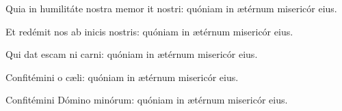 \item Quia in humilitáte nostra memor it nostri:\psstar{} quóniam in ætérnum misericór eius.

\item Et redémit nos ab inicis nostris:\psstar{} quóniam in ætérnum misericór eius.

\item Qui dat escam ni carni:\psstar{} quóniam in ætérnum misericór eius.

\item Confitémini o cæli:\psstar{} quóniam in ætérnum misericór eius.

\item Confitémini Dómino minórum:\psstar{} quóniam in ætérnum misericór eius.
